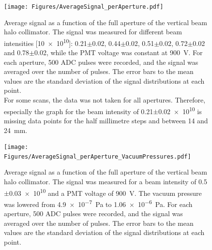 \begin{figure}
\centering
\texttt{[image: Figures/AverageSignal\_perAperture.pdf]}
\caption[RHUL Cherenkov detector signal vs. collimator aperture: different beam intensities]{Average signal as a function of the full aperture of the vertical beam halo collimator. The signal was measured for different beam intensities [\num{10e10}]: 0.21$\pm$0.02, 0.44$\pm$0.02, 0.51$\pm$0.02, 0.72$\pm$0.02 and 0.78$\pm$0.02, while the PMT voltage was constant at \SI{900}{\volt}. For each aperture, 500 ADC pulses were recorded, and the signal was averaged over the number of pulses. The error bars to the mean values are the standard deviation of the signal distributions at each point.\\For some scans, the data was not taken for all apertures. Therefore, especially the graph for the beam intensity of \num{0.21}$\pm$\num{0.02e10} is missing data points for the half millimetre steps and between 14 and \SI{24}{\milli\metre}.}
\label{fig:AverageSignal_Aperture_BeamIntensities}
\end{figure}
\begin{figure}
\centering
\texttt{[image: Figures/AverageSignal\_perAperture\_VacuumPressures.pdf]}
\caption[RHUL Cherenkov detector signal vs. collimator aperture: different vacuum pressures]{Average signal as a function of the full aperture of the vertical beam halo collimator. The signal was measured for a beam intensity of \num{0.5}$\pm$\num{0.03e10} and a PMT voltage of \SI{900}{\volt}. The vacuum pressure was lowered from \SI{4.9e-7}{\pascal} to \SI{1.06e-6}{\pascal}. For each aperture, 500 ADC pulses were recorded, and the signal was averaged over the number of pulses. The error bars to the mean values are the standard deviation of the signal distributions at each point.}
\label{fig:AverageSignal_Aperture_VacuumPressures}
\end{figure}

